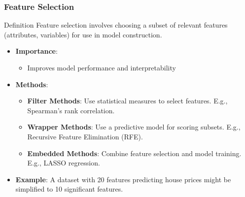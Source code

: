 \documentclass{beamer}
\begin{document}
\begin{frame}[fragile]
    \frametitle{Feature Selection}
    \begin{block}{Definition}
        Feature selection involves choosing a subset of relevant features (attributes, variables) for use in model construction.
    \end{block}
    \begin{itemize}
        \item \textbf{Importance}: 
            \begin{itemize}
                \item Improves model performance and interpretability
            \end{itemize}
        \item \textbf{Methods}:
            \begin{itemize}
                \item \textbf{Filter Methods}: Use statistical measures to select features. E.g., Spearman’s rank correlation.
                \item \textbf{Wrapper Methods}: Use a predictive model for scoring subsets. E.g., Recursive Feature Elimination (RFE).
                \item \textbf{Embedded Methods}: Combine feature selection and model training. E.g., LASSO regression.
            \end{itemize}
        \item \textbf{Example}: A dataset with 20 features predicting house prices might be simplified to 10 significant features.
    \end{itemize}
\end{frame}
\end{document}
